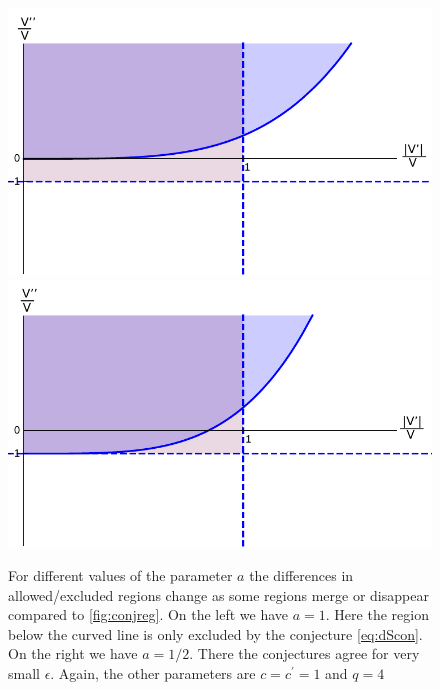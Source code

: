 \documentclass[a4paper,12pt]{report}
\begin{document}
\begin{figure}[htp]
     \centering
     \includegraphics[scale=0.6]{conreg1_mod.pdf}
     \includegraphics[scale=0.6]{conreg2_mod.pdf}
     \caption{For different values of the parameter $a$ the differences in allowed/excluded regions change as some regions merge or disappear compared to \ref{fig:conjreg}. On the left we have $a = 1$. Here the region below the curved line is only excluded by the conjecture \eqref{eq:dScon}. On the right we have $a=1/2$. There the conjectures agree for very small $\epsilon$. Again, the other parameters are $c=c^ \prime = 1$ and $q=4$}
     \label{fig:conjreg2}
\end{figure}
\end{document}
